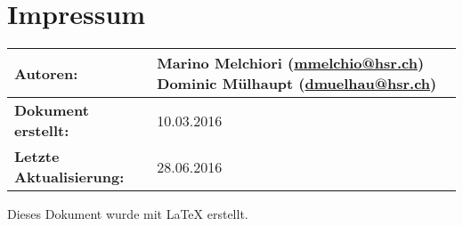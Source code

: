 \chapter*{Impressum}

\begin{table}[H] 
\centering 
\begin{tabular}{|p{0.35\twocelltabwidth}|p{0.65\twocelltabwidth}|}
\hline 
\textbf{Autoren:} & Marino Melchiori (\url{mmelchio@hsr.ch}) \newline
Dominic Mülhaupt (\url{dmuelhau@hsr.ch}) \\ 
\hline 
\textbf{Dokument erstellt:} & 10.03.2016 \\ 
\hline 
\textbf{Letzte Aktualisierung:} & 28.06.2016 \\ 
\hline 
\end{tabular}
\end{table}

Dieses Dokument wurde mit \LaTeX{} erstellt.